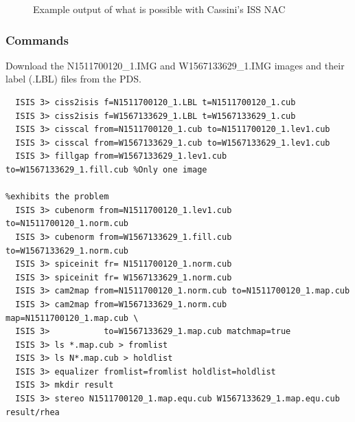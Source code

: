 \begin{figure}[p]
  \hfil
\caption{Example output of what is possible with Cassini's ISS NAC}
\label{fig:cassini-exampe}
\end{figure}

\subsubsection*{Commands}

Download the N1511700120\_1.IMG and W1567133629\_1.IMG images and their label (.LBL) files from the \ac{PDS}.
\begin{verbatim}
  ISIS 3> ciss2isis f=N1511700120_1.LBL t=N1511700120_1.cub
  ISIS 3> ciss2isis f=W1567133629_1.LBL t=W1567133629_1.cub
  ISIS 3> cisscal from=N1511700120_1.cub to=N1511700120_1.lev1.cub
  ISIS 3> cisscal from=W1567133629_1.cub to=W1567133629_1.lev1.cub
  ISIS 3> fillgap from=W1567133629_1.lev1.cub to=W1567133629_1.fill.cub %Only one image
                                                                        %exhibits the problem
  ISIS 3> cubenorm from=N1511700120_1.lev1.cub to=N1511700120_1.norm.cub
  ISIS 3> cubenorm from=W1567133629_1.fill.cub to=W1567133629_1.norm.cub
  ISIS 3> spiceinit fr= N1511700120_1.norm.cub
  ISIS 3> spiceinit fr= W1567133629_1.norm.cub
  ISIS 3> cam2map from=N1511700120_1.norm.cub to=N1511700120_1.map.cub
  ISIS 3> cam2map from=W1567133629_1.norm.cub map=N1511700120_1.map.cub \
  ISIS 3>           to=W1567133629_1.map.cub matchmap=true
  ISIS 3> ls *.map.cub > fromlist
  ISIS 3> ls N*.map.cub > holdlist
  ISIS 3> equalizer fromlist=fromlist holdlist=holdlist
  ISIS 3> mkdir result
  ISIS 3> stereo N1511700120_1.map.equ.cub W1567133629_1.map.equ.cub result/rhea
\end{verbatim}

